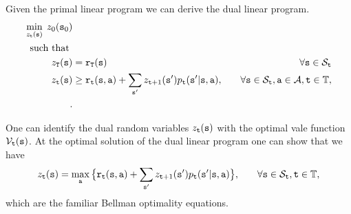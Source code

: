 \begin{leftbar}
Given the primal linear program we can derive the dual linear
program.
\begin{align*}
\min_{z_{\tt t}({\tt s})}  \;z_0({\tt s}_0)&\\
\mbox{ such that }\\
z_{{\tt T}}({\tt s}) &= {\tt r}_{{\tt T}}({\tt s}) &\quad\forall
{\tt s} \in {\mathcal{S}_{{\tt t}}}\\
 z_{{\tt t}}({\tt s}) &\geq
{\tt r}_{{\tt t}}({\tt s},{\tt a}) + \sum_{{\tt s}'}z_{{\tt t} +
1}({\tt s}')p_{{\tt t}}({\tt s}'|{\tt s},{\tt a}) , &\quad\forall {\tt s}
\in {\mathcal{S}_{{\tt t}}},{\tt a}\in\mathcal{A}, {\tt t}\in\mathbb{T},\\ .
\end{align*}

One can identify the dual random variables $z_{\tt t}({\tt s})$ with
the optimal vale function $\mathcal{V}_{\tt t}({\tt s})$. At the optimal
solution of the dual linear program one can show that we have
\begin{align*}
 z_{{\tt t}}({\tt s}) &= \max_{\tt a} \big\{
{\tt r}_{{\tt t}}({\tt s},{\tt a}) + \sum_{{\tt s}'}z_{{\tt t} +
1}({\tt s}')p_{{\tt t}}({\tt s}'|{\tt s},{\tt a}) \big\} , &\quad\forall
{\tt s} \in {\mathcal{S}_{{\tt t}}}, {\tt t}\in\mathbb{T},
\end{align*}
which are the familiar Bellman optimality equations.


%
%
%
%

\end{leftbar}


